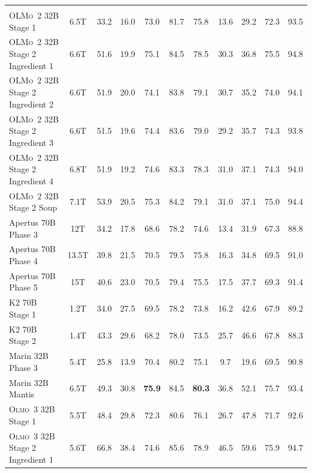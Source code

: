 \documentclass[table]{ai2style/ai2}
\newcommand{\oldOlmo}{OLMo\xspace}
\newcommand{\newOlmo}{Olmo\xspace}
\newcommand{\olmotoo}{\textsc{\oldOlmo~2}\xspace}
\newcommand{\olmothree}{\textsc{\newOlmo~3}\xspace}
\begin{document}
\begin{table}[ht!]
{\begin{center}
\begin{footnotesize}
\begin{tabular}{lc|ccccc|cccc}
\rowcolor{midgrey} \multicolumn{11}{c}{\textbf{32B scale}} \\
\rowcolor{lightgrey}    \olmotoo 32B Stage 1                & 6.5T & 33.2 & 16.0 & 73.0 & 81.7 & 75.8 & 13.6 & 29.2 & 72.3 & 93.5 \\
\rowcolor{lightgrey}    \olmotoo 32B Stage 2 Ingredient 1   & 6.6T & 51.6 & 19.9 & 75.1 & 84.5 & 78.5 & 30.3 & 36.8 & 75.5 & 94.8 \\
\rowcolor{lightgrey}    \olmotoo 32B Stage 2 Ingredient 2   & 6.6T & 51.9 & 20.0 & 74.1 & 83.8 & 79.1 & 30.7 & 35.2 & 74.0 & 94.1 \\
\rowcolor{lightgrey}    \olmotoo 32B Stage 2 Ingredient 3   & 6.6T & 51.5 & 19.6 & 74.4 & 83.6 & 79.0 & 29.2 & 35.7 & 74.3 & 93.8 \\
\rowcolor{lightgrey}    \olmotoo 32B Stage 2 Ingredient 4   & 6.8T & 51.9 & 19.2 & 74.6 & 83.3 & 78.3 & 31.0 & 37.1 & 74.3 & 94.0 \\
\rowcolor{lightgrey}    \olmotoo 32B Stage 2 Soup           & 7.1T & 53.9 & 20.5 & 75.3 & 84.2 & 79.1 & 31.0 & 37.1 & 75.0 & 94.4 \\
\rowcolor{lightgrey}    Apertus 70B Phase 3                 & 12T & 34.2 & 17.8 & 68.6 & 78.2 & 74.6 & 13.4 & 31.9 & 67.3 & 88.8 \\
\rowcolor{lightgrey}    Apertus 70B Phase 4                 & 13.5T & 39.8 & 21.5 & 70.5 & 79.5 & 75.8 & 16.3 & 34.8 & 69.5 & 91.0 \\
\rowcolor{lightgrey}    Apertus 70B Phase 5                 & 15T & 40.6 & 23.0 & 70.5 & 79.4 & 75.5 & 17.5 & 37.7 & 69.3 & 91.4 \\
\rowcolor{lightgrey}    K2 70B Stage 1                      & 1.2T & 34.0 & 27.5 & 69.5 & 78.2 & 73.8 & 16.2 & 42.6 & 67.9 & 89.2 \\
\rowcolor{lightgrey}    K2 70B Stage 2                      & 1.4T & 43.3 & 29.6 & 68.2 & 78.0 & 73.5 & 25.7 & 46.6 & 67.8 & 88.3 \\
\rowcolor{lightgrey}    Marin 32B Phase 3                   & 5.4T & 25.8 & 13.9 & 70.4 & 80.2 & 75.1 & 9.7 & 19.6 & 69.5 & 90.8 \\
\rowcolor{lightgrey}    Marin 32B Mantis                    & 6.5T & 49.3 & 30.8 & {\bf{75.9}} & 84.5 & {\bf{80.3}} & 36.8 & 52.1 & 75.7 & 93.4 \\
\rowcolor{ai2lightpink} \olmothree 32B Stage 1              & 5.5T & 48.4 & 29.8 & 72.3 & 80.6 & 76.1 & 26.7 & 47.8 & 71.7 & 92.6 \\
\rowcolor{ai2lightpink} \olmothree 32B Stage 2 Ingredient 1 & 5.6T & 66.8 & 38.4 & 74.6 & 85.6 & 78.9 & 46.5 & 59.6 & 75.9 & 94.7 \\

\end{tabular}
\end{footnotesize}
\end{center}}
\end{table}
\end{document}
